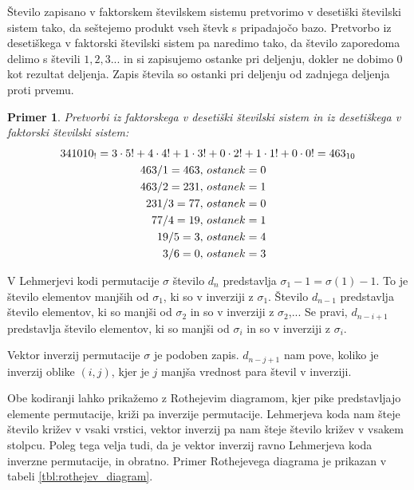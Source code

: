 \documentclass[a4paper, 12pt]{book}
\newtheorem{primer}{Primer}[chapter]
\begin{document}
Število zapisano v faktorskem številskem sistemu pretvorimo v desetiški številski sistem tako, da seštejemo produkt vseh števk s pripadajočo bazo. Pretvorbo iz desetiškega v faktorski številski sistem pa naredimo tako, da število zaporedoma delimo s števili $1, 2, 3...$ in si zapisujemo ostanke pri deljenju, dokler ne dobimo $0$ kot rezultat deljenja. Zapis števila so ostanki pri deljenju od zadnjega deljenja proti prvemu. 

\begin{primer}
Pretvorbi iz faktorskega v desetiški številski sistem in iz desetiškega v faktorski številski sistem: 
    \begin{align}
        341010_{!} = 3 \cdot 5! + 4 \cdot 4! + 1 \cdot 3&! + 0 \cdot 2! + 1 \cdot 1! + 0 \cdot 0! = 463_{10} \notag\\
        463 / 1 = 463,&\ ostanek = 0 \notag\\
        463 / 2 = 231,&\ ostanek = 1 \notag\\
        231 / 3 = 77,&\ ostanek = 0 \notag\\
        77 / 4 = 19,&\ ostanek = 1 \notag\\
        19 / 5 = 3,&\ ostanek = 4 \notag\\
        3 / 6 = 0,&\ ostanek = 3 \notag
    \end{align}
\end{primer}

V Lehmerjevi kodi permutacije $\sigma$ število $d_n$ predstavlja $\sigma_1 - 1 = \sigma(1) - 1$. To je število elementov manjših od $\sigma_1$, ki so v inverziji z $\sigma_1$. Število $d_{n-1}$ predstavlja število elementov, ki so manjši od $\sigma_2$ in so v inverziji z $\sigma_2$,... Se pravi, $d_{n-i+1}$ predstavlja število elementov, ki so manjši od $\sigma_i$ in so v inverziji z $\sigma_i$.

Vektor inverzij permutacije $\sigma$ je podoben zapis. $d_{n-j+1}$ nam pove, koliko je inverzij oblike $(i, j)$, kjer je $j$ manjša vrednost para števil v inverziji.

Obe kodiranji lahko prikažemo z Rothejevim diagramom, kjer pike predstavljajo elemente permutacije, križi pa inverzije permutacije. Lehmerjeva koda nam šteje število križev v vsaki vrstici, vektor inverzij pa nam šteje število križev v vsakem stolpcu. Poleg tega velja tudi, da je vektor inverzij ravno Lehmerjeva koda inverzne permutacije, in obratno. Primer Rothejevega diagrama je prikazan v tabeli \ref{tbl:rothejev_diagram}.
\end{document}
